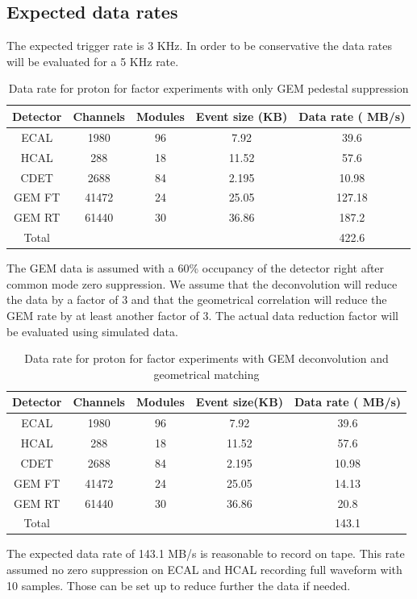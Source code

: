 \documentclass{article}
\begin{document}
\subsection {Expected data rates}
The expected trigger rate is 3 KHz. In order to be conservative the data rates will be evaluated for a 5 KHz rate.

\begin{table}
\begin{tabular}{|c|c|c|c|c|}
\hline
Detector & Channels & Modules & Event size (KB) & Data rate ( MB/s)\\
\hline
ECAL&1980&96&7.92&39.6\\
HCAL&288&18&11.52&57.6\\
CDET&2688&84&2.195&10.98\\
GEM FT&41472&24&25.05&127.18\\
GEM RT&61440&30&36.86&187.2\\
\hline
Total & & & & 422.6\\
\hline
\end{tabular}
\caption{Data rate for proton for factor experiments with only GEM pedestal suppression\label{GEpRateNoDeco}}
\end{table}

The GEM data is assumed with a 60\% occupancy of the detector right after common mode zero suppression. We assume that the deconvolution will reduce the data by a factor of 3 and that the geometrical correlation will reduce the GEM rate by at least another factor of 3. The actual data reduction factor will be evaluated using simulated data.
\begin{table}
\begin{tabular}{|c|c|c|c|c|}
\hline
Detector & Channels & Modules & Event size(KB) & Data rate ( MB/s)\\
\hline
ECAL&1980&96&7.92&39.6\\
HCAL&288&18&11.52&57.6\\
CDET&2688&84&2.195&10.98\\
GEM FT&41472&24&25.05&14.13\\
GEM RT&61440&30&36.86&20.8\\
\hline
Total & & & & 143.1\\
\hline
\end{tabular}
\caption{Data rate for proton for factor experiments with GEM deconvolution and geometrical matching\label{GEpRateDeco}}
\end{table}

The expected data rate of 143.1 MB/s is reasonable to record on tape. This rate assumed no zero suppression on ECAL and HCAL recording full waveform with 10 samples. Those can be set up to reduce further the data if needed.
\end{document}
